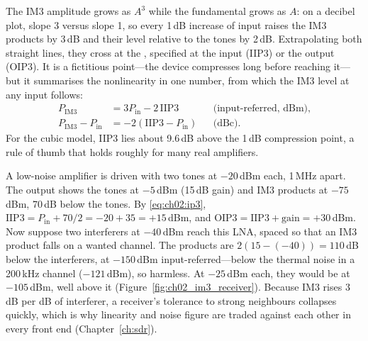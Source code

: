 
The IM3 amplitude grows as $A^3$ while the fundamental grows as $A$: on a decibel plot, slope 3 versus
slope 1, so every 1\,dB increase of input raises the IM3 products by 3\,dB and their level relative to
the tones by 2\,dB. Extrapolating both straight lines, they cross at the , specified at the input (IIP3) or the output (OIP3). It is a fictitious point---the device
compresses long before reaching it---but it summarises the nonlinearity in one number, from which the
IM3 level at any input follows:
\begin{equation}
\begin{aligned}
P_{\text{IM3}}&=3P_{\text{in}}-2\,\text{IIP3}&&\text{(input-referred, dBm)},\\
P_{\text{IM3}}-P_{\text{in}}&=-2(\text{IIP3}-P_{\text{in}})&&\text{(dBc)}.
\end{aligned}
\label{eq:ch02:ip3}
\end{equation}
For the cubic model, IIP3 lies about 9.6\,dB above the 1\,dB compression point, a rule of thumb that
holds roughly for many real amplifiers.

\begin{worked}
A low-noise amplifier is driven with two tones at $-20$\,dBm each, 1\,MHz apart. The output shows the
tones at $-5$\,dBm (15\,dB gain) and IM3 products at $-75$\,dBm, 70\,dB below the tones. By
\eqref{eq:ch02:ip3}, $\text{IIP3}=P_{\text{in}}+70/2=-20+35=+15$\,dBm, and
$\text{OIP3}=\text{IIP3}+\text{gain}=+30$\,dBm. Now suppose two interferers at $-40$\,dBm reach this
LNA, spaced so that an IM3 product falls on a wanted channel. The products are
$2(15-(-40))=110$\,dB below the interferers, at $-150$\,dBm input-referred---below the thermal noise
in a 200\,kHz channel ($-121$\,dBm), so harmless. At $-25$\,dBm each, they would be at $-105$\,dBm,
well above it (Figure~\ref{fig:ch02_im3_receiver}). Because IM3 rises 3\,dB per dB of interferer, a
receiver's tolerance to strong neighbours collapses quickly, which is why linearity and noise figure
are traded against each other in every front end (Chapter~\ref{ch:sdr}).
\end{worked}

